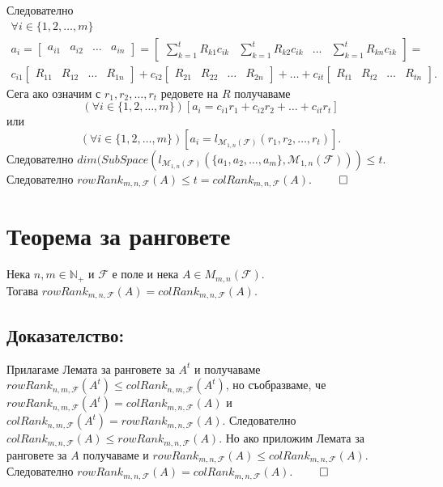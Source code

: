\documentclass[a4paper,9pt]{extarticle}
\newcommand{\Nat}{\mathbb{N}}
\newcommand{\F}{\mathcal{F}}
\begin{document}
Следователно
\begin{align*}
    \forall i \in \{1, 2, \dots, m\} \\
    a_i = \begin{bmatrix}
        a_{i1} &
        a_{i2} &
        \hdots &
        a_{in}
    \end{bmatrix} =
    \begin{bmatrix}
        \displaystyle\sum_{k = 1}^t R_{k1} c_{ik} &
        \displaystyle\sum_{k = 1}^t R_{k2} c_{ik} &
        \hdots &
        \displaystyle\sum_{k = 1}^t R_{kn} c_{ik}
    \end{bmatrix} = \\
    c_{i1} \begin{bmatrix}
        R_{11} & R_{12} & \hdots & R_{1n}
    \end{bmatrix}
    + c_{i2} \begin{bmatrix}
        R_{21} & R_{22} & \hdots & R_{2n}
    \end{bmatrix}
    + \dots + 
    c_{it} \begin{bmatrix}
        R_{t1} & R_{t2} & \hdots & R_{tn}
    \end{bmatrix}.
\end{align*}
Сега ако означим с \(r_1, r_2, \dots, r_t\) редовете на \(R\) получаваме
\[(\forall i \in \{1, 2, \dots, m\})[a_i = c_{i1} r_1 + c_{i2} r_2 + \dots + c_{it} r_t ]\]
или
\[(\forall i \in \{1, 2, \dots, m\})[a_i = l_{\mathcal{M}_{1, n}(\F)}(r_1, r_2, \dots, r_t)].\]
Следователно \(dim(SubSpace(l_{\mathcal{M}_{1, n}(\F)}(\{a_1, a_2, \dots, a_m\}, \mathcal{M}_{1, n}(\F))) \leq t\).\\
Следователно  \(rowRank_{m, n, \F}(A) \leq t = colRank_{m, n, \F}(A)\). \(\qed\)

\section{Теорема за ранговете}
Нека \(n, m \in \Nat_+\) и \(\F\) е поле и нека \(A \in M_{m, n}(\F)\). \\
Тогава \(rowRank_{m, n, \F}(A) = colRank_{m, n, \F}(A)\).

\subsection{Доказателство:}
Прилагаме Лемата за ранговете за \(A^t\) и получаваме \\
\(rowRank_{n, m, \F}(A^t) \leq colRank_{n, m, \F}(A^t)\), но съобразваме, че \\
\(rowRank_{n, m, \F}(A^t) = colRank_{m, n, \F}(A)\) и \(colRank_{n, m, \F}(A^t) = rowRank_{m, n, \F}(A)\).
Следователно \(colRank_{m, n, \F}(A) \leq rowRank_{m, n, \F}(A)\).
Но ако приложим Лемата за ранговете за \(A\) получаваме и \(rowRank_{m, n, \F}(A) \leq colRank_{m, n, \F}(A)\).
Следователно \(rowRank_{m, n, \F}(A) = colRank_{m, n, \F}(A)\). \(\qed\)
\end{document}
